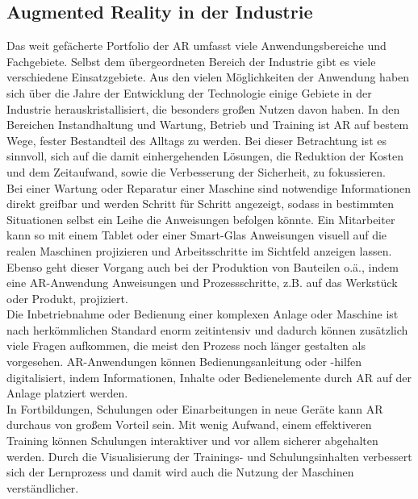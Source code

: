 \subsection{Augmented Reality in der Industrie}
\label{sec:ARIndustrie}
Das weit gefächerte Portfolio der \acl{AR} umfasst viele Anwendungsbereiche und Fachgebiete. Selbst dem übergeordneten Bereich der Industrie 
gibt es viele verschiedene Einsatzgebiete. Aus den vielen Möglichkeiten der Anwendung haben sich über die Jahre der Entwicklung der Technologie 
einige Gebiete in der Industrie herauskristallisiert, die besonders großen Nutzen davon haben. \cite{einsatzgebietear.2017a} In den Bereichen 
Instandhaltung und Wartung, Betrieb und Training ist \acl{AR} auf bestem Wege, fester Bestandteil des Alltags zu werden. Bei dieser Betrachtung 
ist es sinnvoll, sich auf die damit einhergehenden Lösungen, die Reduktion der Kosten und dem Zeitaufwand, sowie die Verbesserung 
der Sicherheit, zu fokussieren. \cite{studieptc.2020j} 
\\ 
\linebreak
Bei einer Wartung oder Reparatur einer Maschine sind notwendige Informationen direkt greifbar und werden Schritt für Schritt angezeigt, sodass 
in bestimmten Situationen selbst ein Leihe die Anweisungen befolgen könnte. 
Ein Mitarbeiter kann so mit einem Tablet oder einer Smart-Glas Anweisungen visuell auf die realen Maschinen 
projizieren und Arbeitsschritte im Sichtfeld anzeigen lassen. Ebenso geht dieser Vorgang auch bei der Produktion von Bauteilen o.ä., indem 
eine \acs{AR}-Anwendung Anweisungen und Prozessschritte, z.B. auf das Werkstück oder Produkt, projiziert.
\\ 
Die Inbetriebnahme oder Bedienung einer komplexen Anlage oder Maschine ist nach herkömmlichen Standard enorm zeitintensiv und dadurch können
zusätzlich viele Fragen aufkommen, die meist den Prozess noch länger gestalten als vorgesehen. \acs{AR}-Anwendungen können 
Bedienungsanleitung oder -hilfen digitalisiert, indem Informationen, Inhalte oder Bedienelemente durch \acl{AR} auf der Anlage platziert werden. 
\\ 
In Fortbildungen, Schulungen oder Einarbeitungen in neue Geräte kann \acs{AR} durchaus von großem Vorteil sein. Mit wenig Aufwand, einem 
effektiveren Training können Schulungen interaktiver und vor allem sicherer abgehalten werden. Durch die Visualisierung der Trainings- und 
Schulungsinhalten verbessert sich der Lernprozess und damit wird auch die Nutzung der Maschinen verständlicher. \cite{einsatzgebietear.2017a}